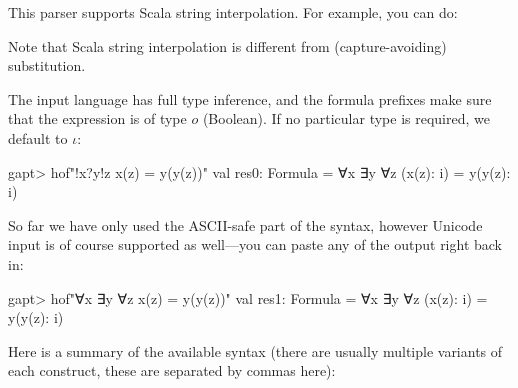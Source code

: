 \documentclass[a4paper,11pt]{book}
\begin{document}
This parser supports Scala string interpolation. For example, you can do:

Note that Scala string interpolation is different from (capture-avoiding) substitution.

The input language has full type inference, and the formula
prefixes make sure that the expression is of type $o$ (Boolean).  If no
particular type is required, we default to $\iota$:
\begin{clilisting}
gapt> hof"!x?y!z x(z) = y(y(z))"
val res0: Formula = ∀x ∃y ∀z (x(z): i) = y(y(z): i)

\end{clilisting}

So far we have only used the ASCII-safe part of the syntax, however Unicode
input is of course supported as well---you can paste any of the output right
back in:
\begin{clilisting}
gapt> hof"∀x ∃y ∀z x(z) = y(y(z))"
val res1: Formula = ∀x ∃y ∀z (x(z): i) = y(y(z): i)

\end{clilisting}

Here is a summary of the available syntax (there are usually multiple variants
of each construct, these are separated by commas here):
\end{document}
